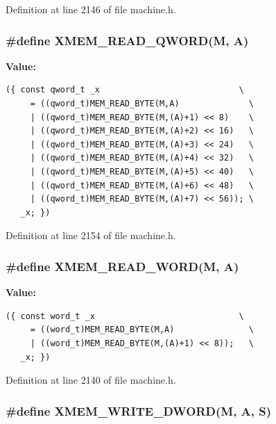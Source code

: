 Definition at line 2146 of file machine.h.
\subsubsection[{XMEM\_\-READ\_\-QWORD}]{\setlength{\rightskip}{0pt plus 5cm}\#define XMEM\_\-READ\_\-QWORD(M, \/  A)}\label{machine_8h_4e3b767716e6d84f13de4c3fcbfffc88}


\textbf{Value:}

\begin{Code}\begin{verbatim}({ const qword_t _x                            \
     = ((qword_t)MEM_READ_BYTE(M,A)              \
     | ((qword_t)MEM_READ_BYTE(M,(A)+1) << 8)    \
     | ((qword_t)MEM_READ_BYTE(M,(A)+2) << 16)   \
     | ((qword_t)MEM_READ_BYTE(M,(A)+3) << 24)   \
     | ((qword_t)MEM_READ_BYTE(M,(A)+4) << 32)   \
     | ((qword_t)MEM_READ_BYTE(M,(A)+5) << 40)   \
     | ((qword_t)MEM_READ_BYTE(M,(A)+6) << 48)   \
     | ((qword_t)MEM_READ_BYTE(M,(A)+7) << 56)); \
   _x; })
\end{verbatim}
\end{Code}


Definition at line 2154 of file machine.h.
\subsubsection[{XMEM\_\-READ\_\-WORD}]{\setlength{\rightskip}{0pt plus 5cm}\#define XMEM\_\-READ\_\-WORD(M, \/  A)}\label{machine_8h_8c6112d8324f7ffa94c3b809bb9d596d}


\textbf{Value:}

\begin{Code}\begin{verbatim}({ const word_t _x                             \
     = ((word_t)MEM_READ_BYTE(M,A)               \
     | ((word_t)MEM_READ_BYTE(M,(A)+1) << 8));   \
   _x; })
\end{verbatim}
\end{Code}


Definition at line 2140 of file machine.h.
\subsubsection[{XMEM\_\-WRITE\_\-DWORD}]{\setlength{\rightskip}{0pt plus 5cm}\#define XMEM\_\-WRITE\_\-DWORD(M, \/  A, \/  S)}\label{machine_8h_8d4928dfc5be638e65b9d2ae7c2e87f8}


